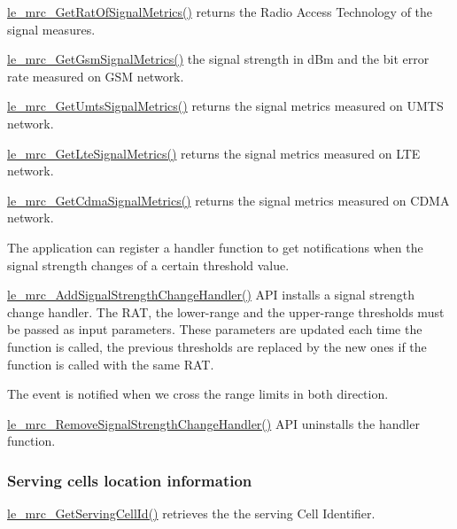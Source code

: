 \hyperlink{le__mrc__interface_8h_a5564bace31c937bcef096e597f33d3a4}{le\+\_\+mrc\+\_\+\+Get\+Rat\+Of\+Signal\+Metrics()} returns the Radio Access Technology of the signal measures.

\hyperlink{le__mrc__interface_8h_a9d7243b29bf4c705c4eba83fa3799582}{le\+\_\+mrc\+\_\+\+Get\+Gsm\+Signal\+Metrics()} the signal strength in d\+Bm and the bit error rate measured on G\+S\+M network.

\hyperlink{le__mrc__interface_8h_a456648564abfc8e9711b60a5d8bddc9b}{le\+\_\+mrc\+\_\+\+Get\+Umts\+Signal\+Metrics()} returns the signal metrics measured on U\+M\+T\+S network.

\hyperlink{le__mrc__interface_8h_a030880c064afbf2686726fd2e538adfe}{le\+\_\+mrc\+\_\+\+Get\+Lte\+Signal\+Metrics()} returns the signal metrics measured on L\+T\+E network.

\hyperlink{le__mrc__interface_8h_a09ff33b24fd01be18a145b2b3f1f579a}{le\+\_\+mrc\+\_\+\+Get\+Cdma\+Signal\+Metrics()} returns the signal metrics measured on C\+D\+M\+A network.

The application can register a handler function to get notifications when the signal strength changes of a certain threshold value.

\hyperlink{le__mrc__interface_8h_ab62b444715b2b530efe5d397eb86a6e8}{le\+\_\+mrc\+\_\+\+Add\+Signal\+Strength\+Change\+Handler()} A\+P\+I installs a signal strength change handler. The R\+A\+T, the lower-\/range and the upper-\/range thresholds must be passed as input parameters. These parameters are updated each time the function is called, the previous thresholds are replaced by the new ones if the function is called with the same R\+A\+T.

The event is notified when we cross the range limits in both direction.

\hyperlink{le__mrc__interface_8h_a789dca8360ddf32a0ea1bfdd24efc6d4}{le\+\_\+mrc\+\_\+\+Remove\+Signal\+Strength\+Change\+Handler()} A\+P\+I uninstalls the handler function.\hypertarget{c_mrc_le_mrc_location}{}\subsubsection{Serving cell\textquotesingle{}s location information}\label{c_mrc_le_mrc_location}
\hyperlink{le__mrc__interface_8h_aafc9fb71c3013b7b26dc386b13ca4a85}{le\+\_\+mrc\+\_\+\+Get\+Serving\+Cell\+Id()} retrieves the the serving Cell Identifier.

